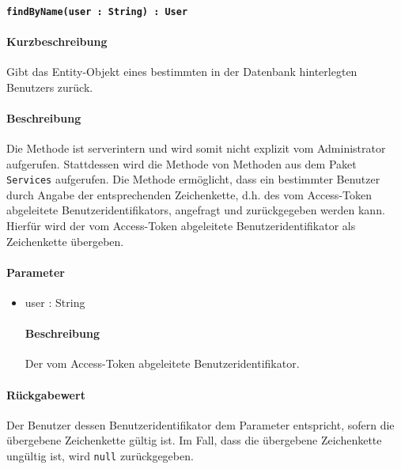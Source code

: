 \paragraph{\texttt{findByName(user : String) : User}}%
\paragraph*{Kurzbeschreibung}
Gibt das Entity-Objekt eines bestimmten in der Datenbank hinterlegten Benutzers zurück.
\paragraph*{Beschreibung}
Die Methode ist serverintern und wird somit nicht explizit vom Administrator aufgerufen.
Stattdessen wird die Methode von Methoden aus dem Paket \texttt{Services} aufgerufen.
Die Methode ermöglicht, dass ein bestimmter Benutzer durch Angabe der entsprechenden Zeichenkette, d.h. des vom Access-Token abgeleitete Benutzeridentifikators, angefragt und zurückgegeben werden kann.
Hierfür wird der vom Access-Token abgeleitete Benutzeridentifikator als Zeichenkette übergeben.
\paragraph*{Parameter}
\begin{itemize}
    \item user : String
    		\paragraph*{Beschreibung}
    		Der vom Access-Token abgeleitete Benutzeridentifikator.
\end{itemize}
\paragraph*{Rückgabewert}
Der Benutzer dessen Benutzeridentifikator dem Parameter entspricht, sofern die übergebene Zeichenkette gültig ist.
Im Fall, dass die übergebene Zeichenkette ungültig ist, wird \texttt{null} zurückgegeben.
